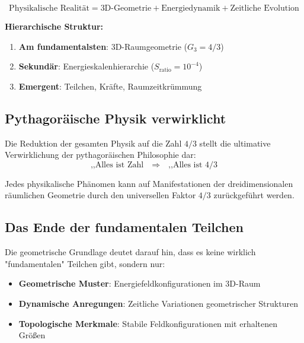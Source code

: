 \documentclass[12pt,a4paper]{report}
\begin{document}
	\begin{equation}
		\text{Physikalische Realität} = \text{3D-Geometrie} + \text{Energiedynamik} + \text{Zeitliche Evolution}
	\end{equation}
	
	\textbf{Hierarchische Struktur:}
	\begin{enumerate}
		\item \textbf{Am fundamentalsten}: 3D-Raumgeometrie ($G_3 = 4/3$)
		\item \textbf{Sekundär}: Energieskalenhierarchie ($S_{\text{ratio}} = 10^{-4}$)
		\item \textbf{Emergent}: Teilchen, Kräfte, Raumzeitkrümmung
	\end{enumerate}
	
	\subsection{Pythagoräische Physik verwirklicht}
	\label{subsec:pythagorean_physics}
	
	Die Reduktion der gesamten Physik auf die Zahl $4/3$ stellt die ultimative Verwirklichung der pythagoräischen Philosophie dar:
\begin{equation}
	\text{,,Alles ist Zahl} \quad \Rightarrow \quad \text{,,Alles ist 4/3}
\end{equation}
	
		Jedes physikalische Phänomen kann auf Manifestationen der dreidimensionalen räumlichen Geometrie durch den universellen Faktor $4/3$ zurückgeführt werden.
	
	\subsection{Das Ende der fundamentalen Teilchen}
	\label{subsec:end_fundamental_particles}
	
	Die geometrische Grundlage deutet darauf hin, dass es keine wirklich "fundamentalen" Teilchen gibt, sondern nur:
	
	\begin{itemize}
		\item \textbf{Geometrische Muster}: Energiefeldkonfigurationen im 3D-Raum
		\item \textbf{Dynamische Anregungen}: Zeitliche Variationen geometrischer Strukturen
		\item \textbf{Topologische Merkmale}: Stabile Feldkonfigurationen mit erhaltenen Größen
	\end{itemize}
	
\end{document}
